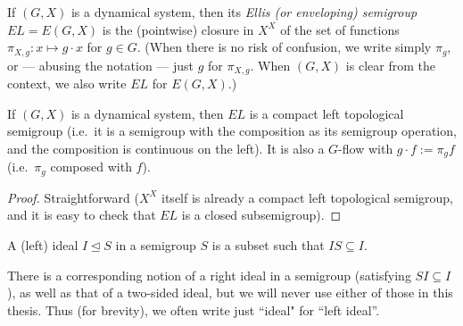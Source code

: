 	
	\begin{dfn}
		\label{dfn:ellis_group_pre}
		If $(G,X)$ is a dynamical system, then its \emph{Ellis (or enveloping) semigroup} $EL=E(G,X)$ is the (pointwise) closure in $X^X$ of the set of functions $\pi_{X,g}\colon x\mapsto g\cdot x$ for $g\in G$. (When there is no risk of confusion, we write simply $\pi_g$, or --- abusing the notation --- just $g$ for $\pi_{X,g}$. When $(G,X)$ is clear from the context, we also write $EL$ for $E(G,X)$.)
		\xqed{\lozenge}
	\end{dfn}
	
	\begin{fct}
		\label{fct:ellis_clst_pre}
		If $(G,X)$ is a dynamical system, then $EL$ is a compact left topological semigroup (i.e.\ it is a semigroup with the composition as its semigroup operation, and the composition is continuous on the left). It is also a $G$-flow with $g\cdot f:= \pi_gf$ (i.e.\ $\pi_g$ composed with $f$).
	\end{fct}
	\begin{proof}
		Straightforward ($X^X$ itself is already a compact left topological semigroup, and it is easy to check that $EL$ is a closed subsemigroup).
	\end{proof}
	
	\begin{dfn}
		\index{ideal}
		\index{left ideal}
		A (left) ideal $I\unlhd S$ in a semigroup $S$ is a subset such that $IS\subseteq I$.\xqed{\lozenge}
	\end{dfn}
	
	\begin{rem}
		There is a corresponding notion of a right ideal in a semigroup (satisfying $SI\subseteq I$), as well as that of a two-sided ideal, but we will never use either of those in this thesis. Thus (for brevity), we often write just ``ideal" for ``left ideal''.\xqed{\lozenge}
	\end{rem}
	
